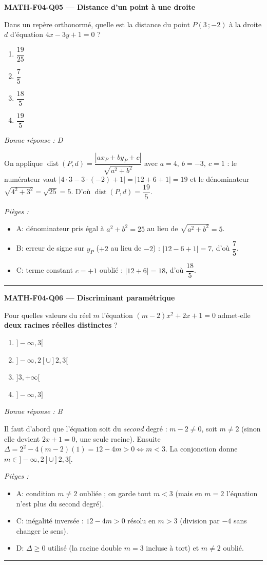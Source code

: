 \documentclass[11pt,a4paper]{article}
\begin{document}
\noindent\textbf{MATH-F04-Q05 --- Distance d'un point à une droite}\par
Dans un repère orthonormé, quelle est la distance du point $P(3\,;-2)$ à la droite $d$ d'équation $4x-3y+1=0$ ?
\begin{enumerate}[label=\Alph*)]
\item $\dfrac{19}{25}$
\item $\dfrac{7}{5}$
\item $\dfrac{18}{5}$
\item $\dfrac{19}{5}$
\end{enumerate}
\textit{Bonne réponse : D}\par
On applique $\operatorname{dist}(P,d)=\dfrac{|a x_P+b y_P+c|}{\sqrt{a^2+b^2}}$ avec $a=4,\ b=-3,\ c=1$ : le numérateur vaut $|4\cdot 3-3\cdot(-2)+1|=|12+6+1|=19$ et le dénominateur $\sqrt{4^2+3^2}=\sqrt{25}=5$. D'où $\operatorname{dist}(P,d)=\dfrac{19}{5}$.\par
\textit{Pièges :}
\begin{itemize}
\item A: dénominateur pris égal à $a^2+b^2=25$ au lieu de $\sqrt{a^2+b^2}=5$.
\item B: erreur de signe sur $y_P$ ($+2$ au lieu de $-2$) : $|12-6+1|=7$, d'où $\dfrac{7}{5}$.
\item C: terme constant $c=+1$ oublié : $|12+6|=18$, d'où $\dfrac{18}{5}$.
\end{itemize}
\vspace{8pt}\hrule\vspace{8pt}

\noindent\textbf{MATH-F04-Q06 --- Discriminant paramétrique}\par
Pour quelles valeurs du réel $m$ l'équation $(m-2)x^2+2x+1=0$ admet-elle \textbf{deux racines réelles distinctes} ?
\begin{enumerate}[label=\Alph*)]
\item $]-\infty, 3[$
\item $]-\infty, 2[\cup]2, 3[$
\item $]3, +\infty[$
\item $]-\infty, 3]$
\end{enumerate}
\textit{Bonne réponse : B}\par
Il faut d'abord que l'équation soit du \emph{second} degré : $m-2\neq 0$, soit $m\neq 2$ (sinon elle devient $2x+1=0$, une seule racine). Ensuite $\Delta=2^2-4(m-2)(1)=12-4m>0\Leftrightarrow m<3$. La conjonction donne $m\in]-\infty, 2[\cup]2, 3[$.\par
\textit{Pièges :}
\begin{itemize}
\item A: condition $m\neq 2$ oubliée ; on garde tout $m<3$ (mais en $m=2$ l'équation n'est plus du second degré).
\item C: inégalité inversée : $12-4m>0$ résolu en $m>3$ (division par $-4$ sans changer le sens).
\item D: $\Delta\geq 0$ utilisé (la racine double $m=3$ incluse à tort) et $m\neq 2$ oublié.
\end{itemize}
\vspace{8pt}\hrule\vspace{8pt}
\end{document}
